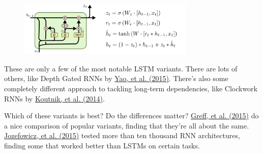 \begin{figure}[htbp]
	\centering
	\includegraphics[width=0.75\textwidth]{fig/14.png}
\end{figure}

These are only a few of the most notable LSTM variants. There are lots of others, like Depth Gated RNNs by \href{http://arxiv.org/pdf/1508.03790v2.pdf}{Yao, et al. (2015)}. There’s also some completely different approach to tackling long-term dependencies, like Clockwork RNNs by \href{http://arxiv.org/pdf/1402.3511v1.pdf}{Koutnik, et al. (2014)}.

Which of these variants is best? Do the differences matter? \href{http://arxiv.org/pdf/1503.04069.pdf}{Greff, et al. (2015)} do a nice comparison of popular variants, finding that they’re all about the same. \href{http://jmlr.org/proceedings/papers/v37/jozefowicz15.pdf}{Jozefowicz, et al. (2015)} tested more than ten thousand RNN architectures, finding some that worked better than LSTMs on certain tasks.

